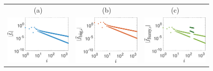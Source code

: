 \documentclass[graybox,footinfo]{svmult}
\begin{document}
\begin{figure}[ht]
\begin{tabular}{c@{\quad}c@{\quad}c}
		\\ (a) & (b) & (c) \\
		\includegraphics[width=\figwidth]{ProgramsImages/FunctionWalshFourierCoeffDecay.eps} &
		\includegraphics[width=\figwidth]{ProgramsImages/ScaledWalshFourierCoeffDecay.eps} &
		\includegraphics[width=\figwidth]{ProgramsImages/FilteredWalshFourierCoeffDecay.eps}

\end{tabular}
\end{figure}
\end{document}
